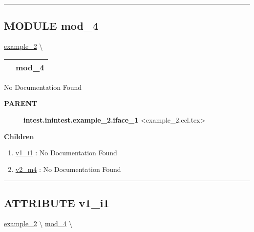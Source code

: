 \rule{\linewidth}{0.5pt}


\subsection*{\textsf{\colorbox{headtoc}{\color{white} MODULE}
mod\_4}}

\hypertarget{ecldoc:intest.inintest.example_2.mod_4}{}
\hspace{0pt} \hyperlink{ecldoc:intest.inintest.example_2}{example_2} \textbackslash 

{\renewcommand{\arraystretch}{1.5}
\begin{tabularx}{\textwidth}{|>{\raggedright\arraybackslash}l|X|}
\hline
\hspace{0pt}\mytexttt{\color{red} } & \textbf{mod\_4} \\
\hline
\end{tabularx}
}

\par





No Documentation Found










\par
\begin{description}
\item [\colorbox{tagtype}{\color{white} \textbf{\textsf{PARENT}}}] \textbf{intest.inintest.example\_2.iface\_1} <example\_2.ecl.tex>
\end{description}


\textbf{Children}
\begin{enumerate}
\item \hyperlink{ecldoc:intest.inintest.example_2.mod_4.v1_i1}{v1\_i1}
: No Documentation Found
\item \hyperlink{ecldoc:intest.inintest.example_2.mod_4.v2_m4}{v2\_m4}
: No Documentation Found
\end{enumerate}

\rule{\linewidth}{0.5pt}

\subsection*{\textsf{\colorbox{headtoc}{\color{white} ATTRIBUTE}
v1\_i1}}

\hypertarget{ecldoc:intest.inintest.example_2.mod_4.v1_i1}{}
\hspace{0pt} \hyperlink{ecldoc:intest.inintest.example_2}{example_2} \textbackslash 
\hspace{0pt} \hyperlink{ecldoc:intest.inintest.example_2.mod_4}{mod_4} \textbackslash 


